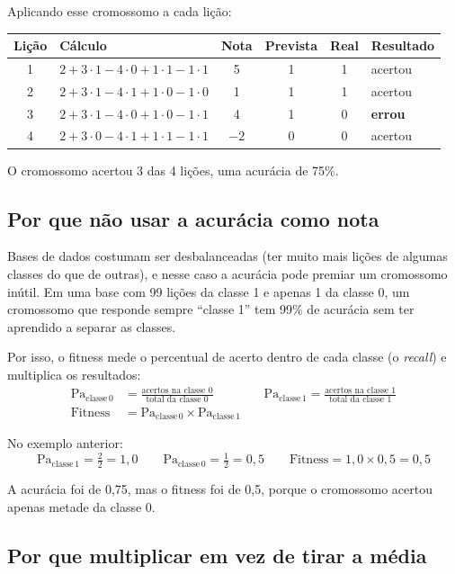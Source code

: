 \documentclass[11pt,a4paper]{article}
\newcommand{\Pa}[1]{\mathrm{Pa}_{\mathrm{classe}\,#1}}
\newenvironment{tabela}{\par\nopagebreak[4]\vspace{0.3em}\nopagebreak[4]\begingroup\centering\small}{\par\endgroup\vspace{0.6em}}
\begin{document}
Aplicando esse cromossomo a cada lição:

\begin{tabela}
\begin{tabular}{clcccl}
\toprule
Lição & Cálculo & Nota & Prevista & Real & Resultado\\
\midrule
1 & $2 + 3\cdot1 - 4\cdot0 + 1\cdot1 - 1\cdot1$ & 5 & 1 & 1 & acertou\\
2 & $2 + 3\cdot1 - 4\cdot1 + 1\cdot0 - 1\cdot0$ & 1 & 1 & 1 & acertou\\
3 & $2 + 3\cdot1 - 4\cdot0 + 1\cdot0 - 1\cdot1$ & 4 & 1 & 0 & \textbf{errou}\\
4 & $2 + 3\cdot0 - 4\cdot1 + 1\cdot1 - 1\cdot1$ & $-2$ & 0 & 0 & acertou\\
\bottomrule
\end{tabular}
\end{tabela}

O cromossomo acertou 3 das 4 lições, uma acurácia de 75\%.

\subsection{Por que não usar a acurácia como nota}

Bases de dados costumam ser desbalanceadas (ter muito mais lições de algumas classes do que de outras), e nesse caso a acurácia pode premiar um cromossomo inútil. Em uma base com 99 lições da classe 1 e apenas 1 da classe 0, um cromossomo que responde sempre ``classe 1'' tem 99\% de acurácia sem ter aprendido a separar as classes.

Por isso, o fitness mede o percentual de acerto dentro de cada classe (o \emph{recall}) e multiplica os resultados:
\begin{align*}
  \Pa{0} &= \frac{\text{acertos na classe 0}}{\text{total da classe 0}}
  \qquad\qquad
  \Pa{1} = \frac{\text{acertos na classe 1}}{\text{total da classe 1}}\\[0.5em]
  \text{Fitness} &= \Pa{0} \times \Pa{1}
\end{align*}

No exemplo anterior:
\[
  \Pa{1} = \tfrac{2}{2} = 1{,}0
  \qquad
  \Pa{0} = \tfrac{1}{2} = 0{,}5
  \qquad
  \text{Fitness} = 1{,}0 \times 0{,}5 = 0{,}5
\]

A acurácia foi de 0,75, mas o fitness foi de 0,5, porque o cromossomo acertou apenas metade da classe 0.

\subsection{Por que multiplicar em vez de tirar a média}
\end{document}
